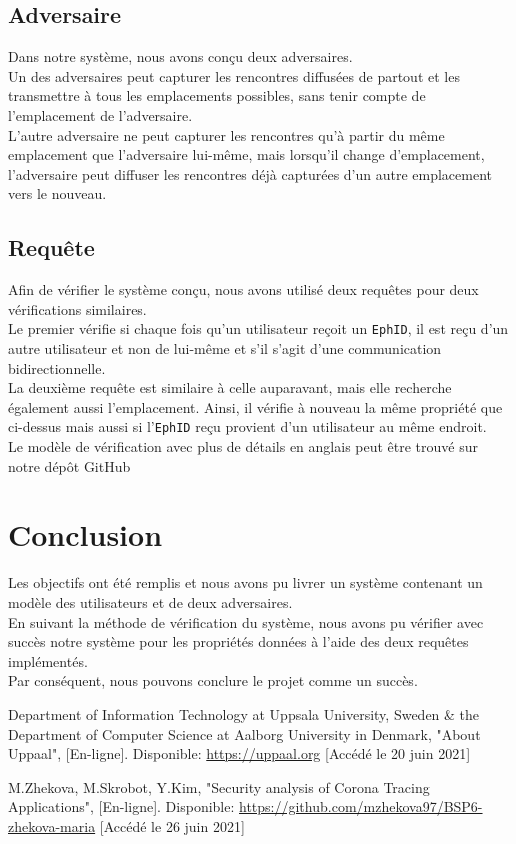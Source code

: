 \documentclass[a4paper, twocolumn]{article}
\begin{document}
\subsection{Adversaire}
Dans notre système, nous avons conçu deux adversaires.\\
Un des adversaires peut capturer les rencontres diffusées de partout et les transmettre à tous les emplacements possibles, sans tenir compte de l'emplacement de l'adversaire.\\
L'autre adversaire ne peut capturer les rencontres qu'à partir du même emplacement que l'adversaire lui-même, mais lorsqu'il change d'emplacement, l'adversaire peut diffuser les rencontres déjà capturées d'un autre emplacement vers le nouveau.

\subsection{Requête}
Afin de vérifier le système conçu, nous avons utilisé deux requêtes pour deux vérifications similaires.\\
Le premier vérifie si chaque fois qu'un utilisateur reçoit un \texttt{EphID}, il est reçu d'un autre utilisateur et non de lui-même et s'il s'agit d'une communication bidirectionnelle.\\
La deuxième requête est similaire à celle auparavant, mais elle recherche également aussi l'emplacement. Ainsi, il vérifie à nouveau la même propriété que ci-dessus mais aussi si l'\texttt{EphID} reçu provient d'un utilisateur au même endroit.\\

\noindent Le modèle de vérification avec plus de détails en anglais peut être trouvé sur notre dépôt GitHub \cite{github}
\section{Conclusion}
Les objectifs ont été remplis et nous avons pu livrer un système contenant un modèle des utilisateurs et de deux adversaires.\\
En suivant la méthode de vérification du système, nous avons pu vérifier avec succès notre système pour les propriétés données à l'aide des deux requêtes implémentés.\\
Par conséquent, nous pouvons conclure le projet comme un succès.

\begin{thebibliography}{9}
Department of Information Technology at Uppsala University, Sweden \& the Department of Computer Science at Aalborg University in Denmark, "About Uppaal", [En-ligne]. Disponible: \url{https://uppaal.org} [Accédé le 20 juin 2021]

M.Zhekova, M.Skrobot, Y.Kim, "Security analysis of Corona Tracing Applications", [En-ligne]. Disponible:  \url{https://github.com/mzhekova97/BSP6-zhekova-maria} [Accédé le 26 juin 2021]

\end{thebibliography}
\end{document}
